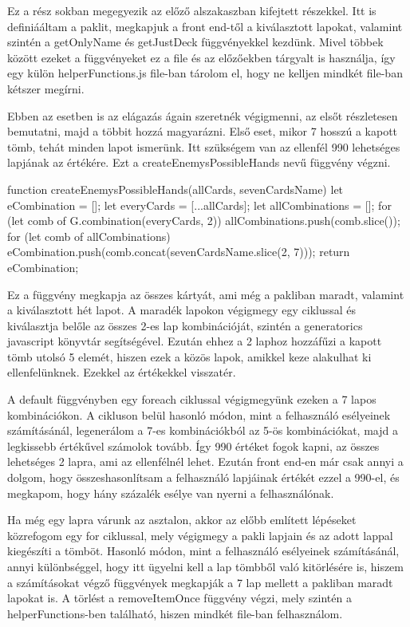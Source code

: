 Ez a rész sokban megegyezik az előző alszakaszban kifejtett részekkel. Itt is definiááltam a paklit, megkapjuk a front end-től a kiválasztott lapokat, valamint szintén a getOnlyName és getJustDeck függvényekkel kezdünk. Mivel többek között ezeket a függvényeket ez a file és az előzőekben tárgyalt is használja, így egy külön helperFunctions.js file-ban tárolom el, hogy ne kelljen mindkét file-ban kétszer megírni.

Ebben az esetben is az elágazás ágain szeretnék végigmenni, az elsőt részletesen bemutatni, majd a többit hozzá magyarázni. Első eset, mikor 7 hosszú a kapott tömb, tehát minden lapot ismerünk. Itt szükségem van az ellenfél 990 lehetséges lapjának az értékére. Ezt a createEnemysPossibleHands nevű függvény végzni.

\begin{python}
function createEnemysPossibleHands(allCards, sevenCardsName) {
  let eCombination = [];
  let everyCards = [...allCards];
  let allCombinations = [];
  for (let comb of G.combination(everyCards, 2)) {
    allCombinations.push(comb.slice());
  }
  for (let comb of allCombinations) {
    eCombination.push(comb.concat(sevenCardsName.slice(2, 7)));
  }
  return eCombination;
}
\end{python}

Ez a függvény megkapja az összes kártyát, ami még a pakliban maradt, valamint a kiválasztott hét lapot. A maradék lapokon végigmegy egy ciklussal és kiválasztja belőle az összes 2-es lap kombinációját, szintén a generatorics javascript könyvtár segítségével. Ezután ehhez a 2 laphoz hozzáfűzi a kapott tömb utolsó 5 elemét, hiszen ezek a közös lapok, amikkel keze alakulhat ki ellenfelünknek. Ezekkel az értékekkel visszatér.

A default függvényben egy foreach ciklussal végigmegyünk ezeken a 7 lapos kombinációkon. A cikluson belül hasonló módon, mint a felhasználó esélyeinek számításánál, legenerálom a 7-es kombinációkból az 5-ös kombinációkat, majd a legkissebb értékűvel számolok tovább. Így 990 értéket fogok kapni, az összes lehetséges 2 lapra, ami az ellenfélnél lehet. Ezután front end-en már csak annyi a dolgom, hogy összeshasonlítsam a felhasználó lapjáinak értékét ezzel a 990-el, és megkapom, hogy hány százalék esélye van nyerni a felhasználónak.

Ha még egy lapra várunk az asztalon, akkor az előbb említett lépéseket közrefogom egy for ciklussal, mely végigmegy a pakli lapjain és az adott lappal kiegészíti a tömböt. Hasonló módon, mint a felhasználó esélyeinek számításánál, annyi különbséggel, hogy itt ügyelni kell a lap tömbből való kitörlésére is, hiszem a számításokat végző függvények megkapják a 7 lap mellett a pakliban maradt lapokat is. A törlést a removeItemOnce függvény végzi, mely szintén a helperFunctions-ben található, hiszen mindkét file-ban felhasználom.


